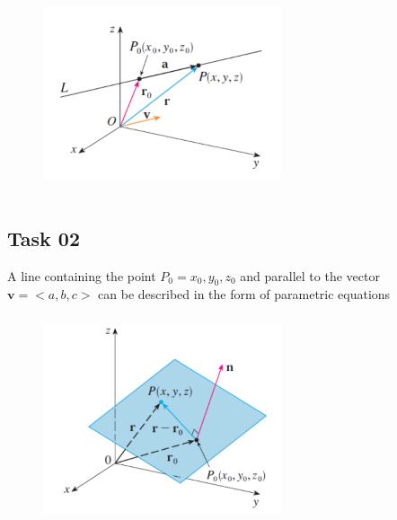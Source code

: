 \documentclass[12pt]{article}%
\begin{document}
 \begin{figure}[h]
\begin{center}
\includegraphics[width=7cm, height=6cm]{line_3d.png}
\caption{}\label{fig:l                                                                                                                                                                                                                                                                                                                                                                                                                                                                                                                                                                                                                                                                                                                             ine}
\end{center}
\end{figure}



\subsection{Task 02}
A line containing the point $P_0= x_0,y_0,z_0$ and parallel to the vector $\mathbf{v}=<a,b,c>$ can be described in the form of parametric equations

 \begin{figure}[h]
\begin{center}
\includegraphics[width=7cm, height=6cm]{3d_plane.png}
\caption{}\label{fig:plane}
\end{center}
\end{figure}
\end{document}
